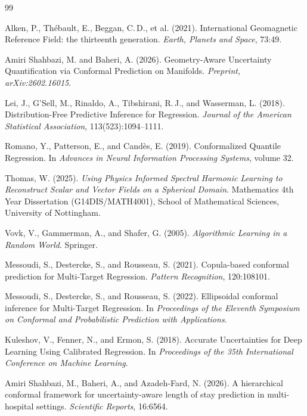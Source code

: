 \documentclass[11pt,a4paper]{report}
\begin{document}
\begin{thebibliography}{99}

Alken, P., Th\'ebault, E., Beggan, C.\,D., et al. (2021).
International Geomagnetic Reference Field: the thirteenth generation.
\textit{Earth, Planets and Space}, 73:49.

Amiri Shahbazi, M. and Baheri, A. (2026).
Geometry-Aware Uncertainty Quantification via Conformal Prediction on Manifolds.
\textit{Preprint, arXiv:2602.16015}.

Lei, J., G'Sell, M., Rinaldo, A., Tibshirani, R.\,J., and Wasserman, L. (2018).
Distribution-Free Predictive Inference for Regression.
\textit{Journal of the American Statistical Association}, 113(523):1094--1111.

Romano, Y., Patterson, E., and Cand\`es, E. (2019).
Conformalized Quantile Regression.
In \textit{Advances in Neural Information Processing Systems}, volume 32.

Thomas, W. (2025).
\textit{Using Physics Informed Spectral Harmonic Learning to Reconstruct Scalar and Vector Fields on a Spherical Domain}.
Mathematics 4th Year Dissertation (G14DIS/MATH4001), School of Mathematical Sciences, University of Nottingham.

Vovk, V., Gammerman, A., and Shafer, G. (2005).
\textit{Algorithmic Learning in a Random World}. Springer.

Messoudi, S., Destercke, S., and Rousseau, S. (2021).
Copula-based conformal prediction for Multi-Target Regression.
\textit{Pattern Recognition}, 120:108101.

Messoudi, S., Destercke, S., and Rousseau, S. (2022).
Ellipsoidal conformal inference for Multi-Target Regression.
In \textit{Proceedings of the Eleventh Symposium on Conformal and Probabilistic Prediction with Applications}.

Kuleshov, V., Fenner, N., and Ermon, S. (2018).
Accurate Uncertainties for Deep Learning Using Calibrated Regression.
In \textit{Proceedings of the 35th International Conference on Machine Learning}.

Amiri Shahbazi, M., Baheri, A., and Azadeh-Fard, N. (2026).
A hierarchical conformal framework for uncertainty-aware length of stay prediction in multi-hospital settings.
\textit{Scientific Reports}, 16:6564.


\end{thebibliography}
\end{document}
